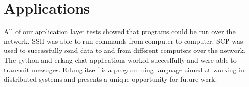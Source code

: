 \section{Applications}

All of our application layer tests showed that programs could be run over the network. SSH was able to run commands from computer to computer. SCP was used to successfully send data to and from different computers over the network. The python and erlang chat applications worked succesffully and were able to transmit messages. Erlang itself is a programming language aimed at working in distributed systems and presents a unique opportunity for future work. 
